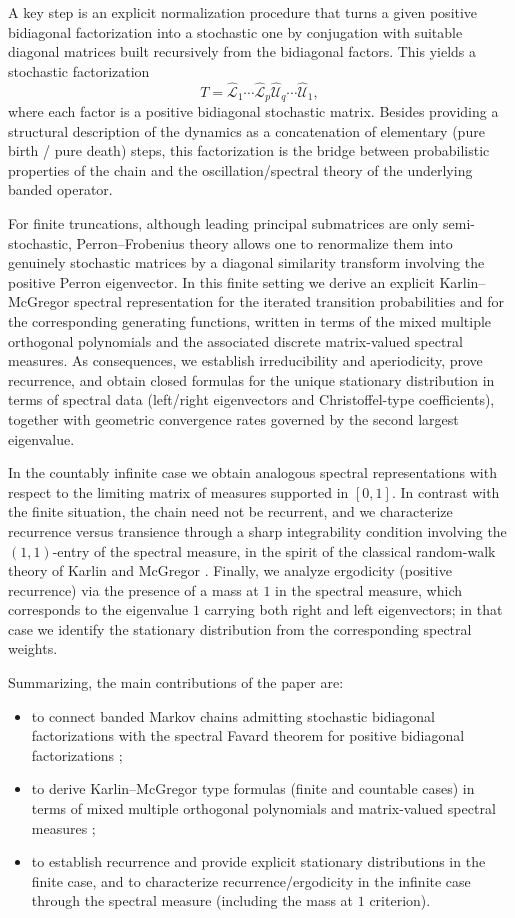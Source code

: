 \documentclass[11pt]{amsart}
\theoremstyle{plain}
\newcommand{\1}{\text{\fontseries{bx}\selectfont \textup 1}}
\begin{document}
 A key step is an explicit normalization procedure that turns a given positive bidiagonal factorization into a stochastic one by conjugation with suitable diagonal matrices built recursively from the bidiagonal factors. This yields a stochastic factorization
 \[
 T=\hat{\mathscr L}_1\cdots\hat{\mathscr L}_p\hat{\mathscr U}_q\cdots \hat{\mathscr U}_1,
 \]
 where each factor is a positive bidiagonal stochastic matrix. Besides providing a structural description of the dynamics as a concatenation of elementary (pure birth / pure death) steps, this factorization is the bridge between probabilistic properties of the chain and the oscillation/spectral theory of the underlying banded operator.
 
 For finite truncations, although leading principal submatrices are only semi-stochastic, Perron--Frobenius theory allows one to renormalize them into genuinely stochastic matrices by a diagonal similarity transform involving the positive Perron eigenvector. In this finite setting we derive an explicit Karlin--McGregor spectral representation for the iterated transition probabilities and for the corresponding generating functions, written in terms of the mixed multiple orthogonal polynomials and the associated discrete matrix-valued spectral measures. As consequences, we establish irreducibility and aperiodicity, prove recurrence, and obtain closed formulas for the unique stationary distribution in terms of spectral data (left/right eigenvectors and Christoffel-type coefficients), together with geometric convergence rates governed by the second largest eigenvalue.
 
 In the countably infinite case we obtain analogous spectral representations with respect to the limiting matrix of measures supported in $[0,1]$. In contrast with the finite situation, the chain need not be recurrent, and we characterize recurrence versus transience through a sharp integrability condition involving the $(1,1)$-entry of the spectral measure, in the spirit of the classical random-walk theory of Karlin and McGregor \cite{KarlinMcGregor}. Finally, we analyze ergodicity (positive recurrence) via the presence of a mass at $1$ in the spectral measure, which corresponds to the eigenvalue $1$ carrying both right and left eigenvectors; in that case we identify the stationary distribution from the corresponding spectral weights.
 
 Summarizing, the main contributions of the paper are:
 \begin{itemize}
 	\item to connect banded Markov chains admitting stochastic bidiagonal factorizations with the spectral Favard theorem for positive bidiagonal factorizations \cite{BFM1,BFM4};
 	\item to derive Karlin--McGregor type formulas (finite and countable cases) in terms of mixed multiple orthogonal polynomials and matrix-valued spectral measures \cite{afm,KarlinMcGregor};
 	\item to establish recurrence and provide explicit stationary distributions in the finite case, and to characterize recurrence/ergodicity in the infinite case through the spectral measure (including the mass at $1$ criterion).
 \end{itemize}
 
\end{document}
